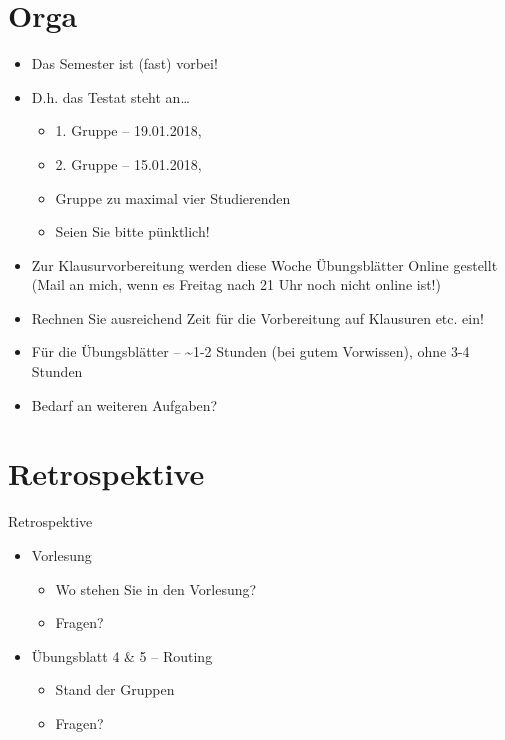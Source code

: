 \documentclass[xcolor=dvipsnames]{beamer}
\begin{document}
\section{Orga}
\begin{frame}
	\begin{itemize}
		\item Das Semester ist (fast) vorbei!
		\item D.h. das Testat steht an\dots
		\begin{itemize}
			\item 1. Gruppe -- 19.01.2018, 
			\item 2. Gruppe -- 15.01.2018, 
			\item Gruppe zu maximal vier Studierenden
			\item Seien Sie bitte pünktlich!
		\end{itemize}
		\item Zur Klausurvorbereitung werden diese Woche Übungsblätter Online gestellt (Mail an mich, wenn es Freitag nach 21 Uhr noch nicht online ist!)
		\item Rechnen Sie ausreichend Zeit für die Vorbereitung auf Klausuren etc. ein!
		\item Für die Übungsblätter -- \textasciitilde 1-2 Stunden (bei gutem Vorwissen), ohne 3-4 Stunden
		\item Bedarf an weiteren Aufgaben?
	\end{itemize}
\end{frame}

\section{Retrospektive}
\begin{frame}{Retrospektive}
\begin{itemize}
	\item Vorlesung
	\begin{itemize}
		\item Wo stehen Sie in den Vorlesung?
		\item Fragen?
	\end{itemize}
	\item Übungsblatt 4 \& 5 -- Routing
	\begin{itemize}
		\item Stand der Gruppen
		\item Fragen?
	\end{itemize}
\end{itemize}
\end{frame}
\end{document}
